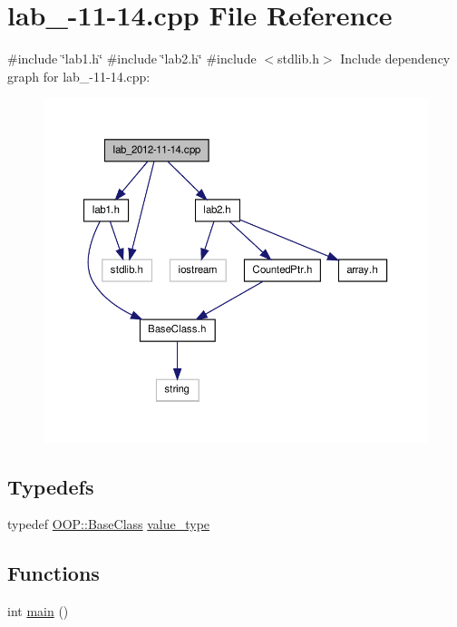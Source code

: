 \hypertarget{lab__2012-11-14_8cpp}{\section{lab\-\_-\/11-\/14.cpp \-File \-Reference}
\label{lab__2012-11-14_8cpp}
}
{\ttfamily \#include \char`\"{}lab1.\-h\char`\"{}}\*
{\ttfamily \#include \char`\"{}lab2.\-h\char`\"{}}\*
{\ttfamily \#include $<$stdlib.\-h$>$}\*
\-Include dependency graph for lab\-\_-\/11-\/14.cpp\-:
\nopagebreak
\begin{figure}[H]
\begin{center}
\leavevmode
\includegraphics[width=350pt]{lab__2012-11-14_8cpp__incl}
\end{center}
\end{figure}
\subsection*{\-Typedefs}
\begin{DoxyCompactItemize}
\item 
typedef \hyperlink{classOOP_1_1BaseClass}{\-O\-O\-P\-::\-Base\-Class} \hyperlink{lab__2012-11-14_8cpp_a1ebf4c1886eac7249b0dce3557d4a720}{value\-\_\-type}
\end{DoxyCompactItemize}
\subsection*{\-Functions}
\begin{DoxyCompactItemize}
\item 
int \hyperlink{lab__2012-11-14_8cpp_ae66f6b31b5ad750f1fe042a706a4e3d4}{main} ()
\end{DoxyCompactItemize}


